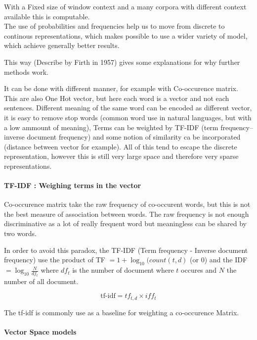 			With a Fixed size of window context and a many corpora with different context available this is computable. \\
			The use of probabilities and frequencies help us to move from discrete to continous representations, which makes possible to use a wider variety of model, which achieve generally better results. 

			This way (Describe by Firth in 1957) gives some explanations for why further methods work.

			It can be done with different manner, for example with Co-occurence matrix. This are also One Hot vector, but here each word is a vector and not each sentences. Different meaning of the same word can be encoded as different vector, it is easy to remove stop words (common word use in natural languages, but with a low ammount of meaning), Terms can be weighted by TF-IDF (term frequency–inverse document frequency) and some notion of similarity ca be incorporated (distance between vector for example). All of this tend to escape the discrete representation, however this is still very large space and therefore very sparse representations.

		\paragraph*{TF-IDF : Weighing terms in the vector}

			Co-occurence matrix take the raw frequency of co-occurent words, but this is not the best measure of association between words. The raw frequency is not enough discriminative as a lot of really frequent word but meaningless can be shared by two words.

			In order to avoid this paradox, the TF-IDF (Term frequency - Inverse document frequency) use the product of TF $= 1 + \log_{10} (count(t, d) $ (or 0) and the IDF $= \log_{10} \frac{N}{df_t}$ where $df_t$  is the number of document where $t$ occures and $N$ the number of all document. 

			\[
				\text{tf-idf} = tf_{t,d} \times iff_t
			\]

			The tf-idf is commonly use as a baseline for weighting a co-occurence Matrix.
		\paragraph*{Vector Space models}

